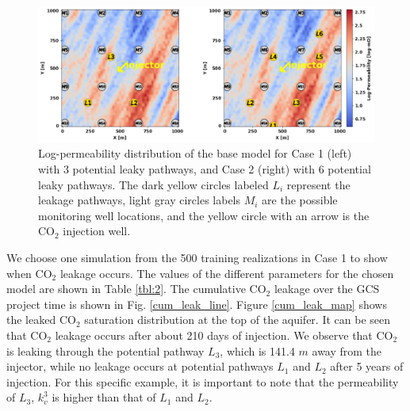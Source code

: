 \documentclass[a4paper,fleqn]{cas-sc}
\begin{document}
\begin{figure}
    \centering
    \includegraphics[width=15cm]{figs/Figure 7.pdf}
    \caption{Log-permeability distribution of the base model for Case 1 (left) with 3 potential leaky pathways, and Case 2 (right) with 6 potential leaky pathways. The dark yellow circles labeled $L_i$ represent the leakage pathways, light gray circles labels $M_i$ are the possible monitoring well locations, and the yellow circle with an arrow is the CO$_2$ injection well.}
    \label{cases}
\end{figure}

We choose one simulation from the 500 training realizations in Case 1 to show when CO$_2$ leakage occurs. The values of the different parameters for the chosen model are shown in Table \ref{tbl:2}. The cumulative CO$_2$ leakage over the GCS project time is shown in Fig. \ref{cum_leak_line}. Figure \ref{cum_leak_map} shows the leaked CO$_2$ saturation distribution at the top of the aquifer. It can be seen that CO$_2$ leakage occurs after about 210 days of injection. We observe that CO$_2$ is leaking through the potential pathway $L_3$, which is 141.4 $m$ away from the injector, while no leakage occurs at potential pathways $L_1$ and $L_2$ after 5 years of injection. For this specific example, it is important to note that the permeability of $L_3$, $k_v^3$ is higher than that of $L_1$ and $L_2$.
\end{document}

